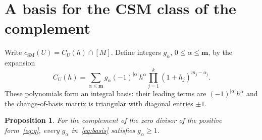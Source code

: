 \documentclass[11pt]{article}
\newtheorem{proposition}[theorem]{Proposition}
\theoremstyle{remark}\newtheorem{remark}[theorem]{Remark}
\newcommand{\csm}{c_{\mathrm{SM}}}
\begin{document}
\section{A basis for the CSM class of the complement}
Write $\csm(U)=C_U(h)\cap[M]$. Define integers $g_\alpha$, $0\leq\alpha\leq\mathbf m$, by the expansion
\begin{equation}\label{eq:basis}
 C_U(h)=\sum_{\alpha\leq\mathbf m}
 g_\alpha(-1)^{|\alpha|}h^\alpha
 \prod_{j=1}^k(1+h_j)^{m_j-\alpha_j}.
\end{equation}
These polynomials form an integral basis: their leading terms are $(-1)^{|\alpha|}h^\alpha$ and the change-of-basis matrix is triangular with diagonal entries $\pm1$.

\begin{proposition}\label{prop:g-positive}
For the complement of the zero divisor of the positive form~\eqref{eq:q}, every $g_\alpha$ in~\eqref{eq:basis} satisfies $g_\alpha\geq1$.
\end{proposition}
\end{document}
